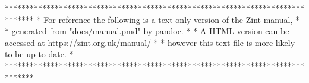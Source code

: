 *******************************************************************************
* For reference the following is a text-only version of the Zint manual,      *
* generated from "docs/manual.pmd" by pandoc.                                 *
* A HTML version can be accessed at https://zint.org.uk/manual/               *
* however this text file is more likely to be up-to-date.                     *
*******************************************************************************
